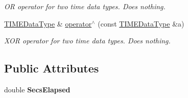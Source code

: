 \begin{DoxyCompactItemize}
\begin{DoxyCompactList}\small\item\em OR operator for two time data types. Does nothing. \end{DoxyCompactList}\item 
\hyperlink{structpc__emulator_1_1TIMEDataType}{T\+I\+M\+E\+Data\+Type} \& \hyperlink{structpc__emulator_1_1TIMEDataType_acc18b8892a0428578d50171003f791a0}{operator$^\wedge$} (const \hyperlink{structpc__emulator_1_1TIMEDataType}{T\+I\+M\+E\+Data\+Type} \&a)\hypertarget{structpc__emulator_1_1TIMEDataType_acc18b8892a0428578d50171003f791a0}{}\label{structpc__emulator_1_1TIMEDataType_acc18b8892a0428578d50171003f791a0}

\begin{DoxyCompactList}\small\item\em X\+OR operator for two time data types. Does nothing. \end{DoxyCompactList}\end{DoxyCompactItemize}
\subsection*{Public Attributes}
\begin{DoxyCompactItemize}
\item 
double {\bfseries Secs\+Elapsed}\hypertarget{structpc__emulator_1_1TIMEDataType_a4e9deb2e578e0ba4f904bb2023abb837}{}\label{structpc__emulator_1_1TIMEDataType_a4e9deb2e578e0ba4f904bb2023abb837}

\end{DoxyCompactItemize}
